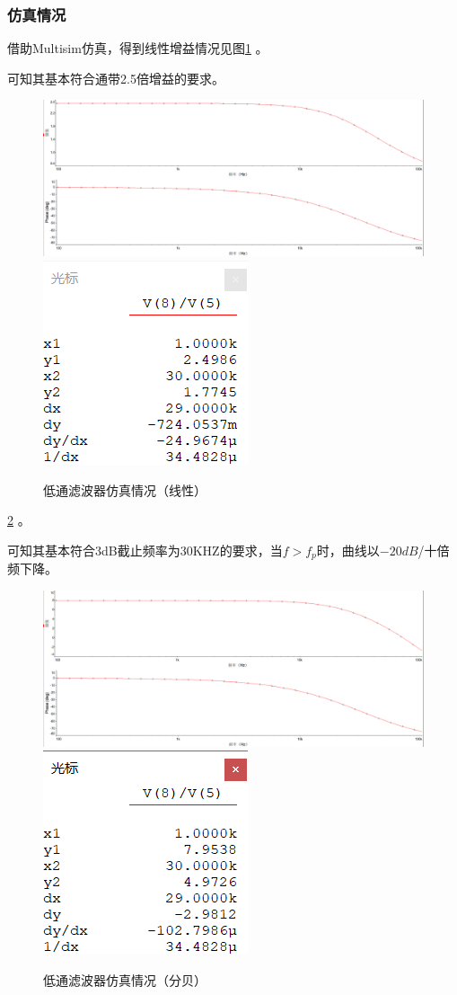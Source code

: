 \documentclass[12pt]{article}
\begin{document}
\subsubsection{仿真情况}
借助Multisim仿真，得到线性增益情况见图\ref{qzzyfzt112}
。\par 可知其基本符合通带2.5倍增益的要求。
\begin{figure}[htbp]
  \centering
  \includegraphics[width=\textwidth]{picture/TIM20190505132307}\\
  \includegraphics[width=.3\textwidth]{picture/TIM20190505132403}
  \caption{低通滤波器仿真情况（线性）}\label{qzzyfzt112}
\end{figure}\ref{qzzyfzt1121}
。\par 可知其基本符合3dB截止频率为30KHZ的要求，当$f>f_p$时，曲线以$-20dB$/十倍频下降。
\begin{figure}[htbp]
  \centering
  \includegraphics[width=\textwidth]{picture/TIM20190505132825}\\
  \includegraphics[width=.3\textwidth]{picture/TIM20190505132907}
  \caption{低通滤波器仿真情况（分贝）}\label{qzzyfzt1121}
\end{figure}
\end{document}

